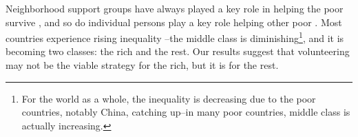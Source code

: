 \documentclass[10pt, letterpaper]{article}
\begin{document}
\begin{spacing}{1.4}

Neighborhood support groups have always played a key role in helping the poor
survive \citep{saegert2002social}, and so do individual persons play a key role
helping other poor \citep{mazelis2017surviving}. Most countries experience
rising inequality \citep{piketty03,mackintosh13,oecd08,verbeek15}--the middle
class is diminishing\footnote{For the world as a whole, the inequality is
  decreasing due to the poor countries, notably China, catching up--in many poor
  countries, middle class is actually increasing.}, and it is becoming two classes: the rich and the
rest. Our results suggest that volunteering may not be the viable strategy for the rich, but it is for the rest.
 






    



\end{spacing}
\end{document}
